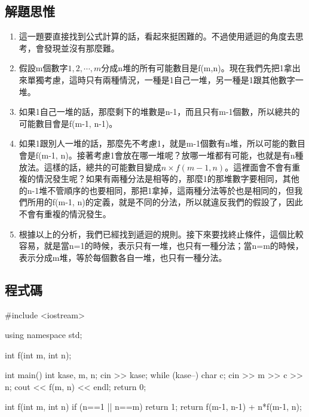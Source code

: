 \subsection{解題思惟}
\begin{enumerate}
	\item 這一題要直接找到公式計算的話，看起來挺困難的。不過使用遞迴的角度去思考，會發現並沒有那麼難。
	\item 假設m個數字$1,2,\cdots,m$分成n堆的所有可能數目是f(m,n)。現在我們先把1拿出來單獨考慮，這時只有兩種情況，一種是1自己一堆，另一種是1跟其他數字一堆。
	\item 如果1自己一堆的話，那麼剩下的堆數是n-1，而且只有m-1個數，所以總共的可能數目會是f(m-1, n-1)。
	\item 如果1跟別人一堆的話，那麼先不考慮1，就是m-1個數有n堆，所以可能的數目會是f(m-1, n)。接著考慮1會放在哪一堆呢？放哪一堆都有可能，也就是有n種放法。這樣的話，總共的可能數目變成$n\times f(m-1, n)$。這裡面會不會有重複的情況發生呢？如果有兩種分法是相等的，那麼1的那堆數字要相同，其他的n-1堆不管順序的也要相同，那把1拿掉，這兩種分法等於也是相同的，但我們所用的f(m-1, n)的定義，就是不同的分法，所以就違反我們的假設了，因此不會有重複的情況發生。
	\item 根據以上的分析，我們已經找到遞迴的規則。接下來要找終止條件，這個比較容易，就是當n=1的時候，表示只有一堆，也只有一種分法；當n=m的時候，表示分成m堆，等於每個數各自一堆，也只有一種分法。
\end{enumerate}

\subsection{程式碼}
\begin{cppcode}
#include <iostream>

using namespace std;

int f(int m, int n);

int main()
{
	int kase, m, n;
	cin >> kase;
	while (kase--) {
		char c;
		cin >> m >> c >> n;
		cout << f(m, n) << endl;
	}
	return 0;
}

int f(int m, int n)
{
	if (n==1 || n==m) return 1;
	return f(m-1, n-1) + n*f(m-1, n);
}
\end{cppcode}